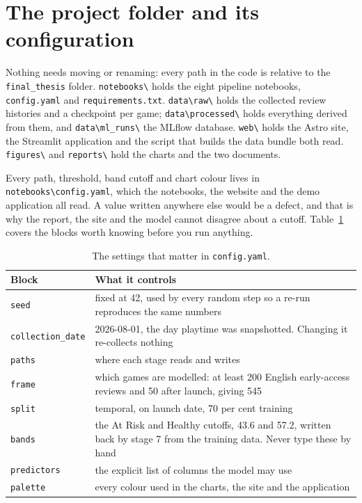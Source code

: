\section{The project folder and its configuration}
\label{sec:folder}

Nothing needs moving or renaming: every path in the code is relative to the \texttt{final\_thesis}
folder. \texttt{notebooks\textbackslash} holds the eight pipeline notebooks,
\texttt{config.yaml} and \texttt{requirements.txt}. \texttt{data\textbackslash raw\textbackslash}
holds the collected review histories and a checkpoint per game;
\texttt{data\textbackslash processed\textbackslash} holds everything derived from them, and
\texttt{data\textbackslash ml\_runs\textbackslash} the MLflow database.
\texttt{web\textbackslash} holds the Astro site, the Streamlit application and the script that
builds the data bundle both read. \texttt{figures\textbackslash} and
\texttt{reports\textbackslash} hold the charts and the two documents.


Every path, threshold, band cutoff and chart colour lives in
\texttt{notebooks\textbackslash config.yaml}, which the notebooks, the website and the demo
application all read. A value written anywhere else would be a defect, and that is why the report,
the site and the model cannot disagree about a cutoff. Table~\ref{tab:config} covers the blocks
worth knowing before you run anything.

\begin{table}[htbp]
\centering
\caption{The settings that matter in \texttt{config.yaml}.}
\label{tab:config}
\small
\begin{tabular}{|p{2.6cm}|p{11.4cm}|}
\hline
\textbf{Block} & \textbf{What it controls} \\
\hline
\texttt{seed} & fixed at 42, used by every random step so a re-run reproduces the same numbers \\
\hline
\texttt{collection\_date} & 2026-08-01, the day playtime was snapshotted. Changing it re-collects
nothing \\
\hline
\texttt{paths} & where each stage reads and writes \\
\hline
\texttt{frame} & which games are modelled: at least 200 English early-access reviews and 50 after
launch, giving 545 \\
\hline
\texttt{split} & temporal, on launch date, 70 per cent training \\
\hline
\texttt{bands} & the At Risk and Healthy cutoffs, 43.6 and 57.2, written back by stage 7 from the
training data. Never type these by hand \\
\hline
\texttt{predictors} & the explicit list of columns the model may use \\
\hline
\texttt{palette} & every colour used in the charts, the site and the application \\
\hline
\end{tabular}
\end{table}

